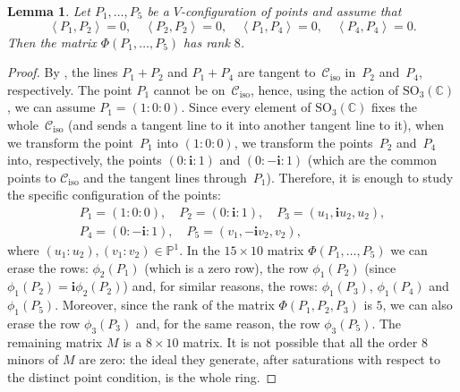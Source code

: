 \documentclass{amsart}
\theoremstyle{plain}
\newtheorem{lemma}{Lemma}[section]
\theoremstyle{definition}
\newcommand{\p}{\mathbb{P}}
\newcommand{\iso}{\mathcal{C}_{\mathrm{iso}}}
\newcommand{\scl}[2]{\left\langle {#1}, {#2} \right\rangle}
\newcommand{\iii}{\textbf{i}}
\begin{document}
\begin{lemma}
\label{lemma:special_case_rank_8}
Let $P_1, \dots, P_5$ be a $V$-configuration of points and assume that
\[
\scl{P_1}{P_2}=0, \quad \scl{P_2}{P_2}=0, \quad \scl{P_1}{P_4}=0,
\quad \scl{P_4}{P_4}=0.
\]
Then the matrix $\Phi(P_1, \dots, P_5)$ has rank $8$.
\end{lemma}
\begin{proof}
By ,
the lines $P_1+P_2$ and $P_1+P_4$ are tangent to~$\iso$ in~$P_2$ and~$P_4$, respectively. The point $P_1$ cannot be on~$\iso$, hence, using the
action of $\mathrm{SO}_3(\mathbb{C})$, we can assume $P_1 = (1: 0: 0)$.
Since every element of $\mathrm{SO}_3(\mathbb{C})$ fixes the whole~$\iso$ (and sends a tangent line to it into another tangent line to it), when we transform the point~$P_1$
into $(1: 0: 0)$, we transform the points~$P_2$ and~$P_4$ into, respectively,
the points $(0: \iii: 1)$ and $(0: -\iii: 1)$ (which are the common points to
$\iso$ and the tangent lines through~$P_1$).
Therefore, it is enough to study the
specific configuration of the points:
%
\begin{gather*}
P_1 = (1: 0: 0), \quad P_2=(0: \iii: 1), \quad P_3=(u_1, \iii u_2, u_2), \\
P_4 = (0: -\iii: 1), \quad P_5 = (v_1, -\iii v_2, v_2),
\end{gather*}
%
where $(u_1: u_2), (v_1: v_2) \in \p^1$.
In the $15\times 10$ matrix $\Phi(P_1, \dots, P_5)$ we can erase the
rows: $\phi_2(P_1)$ (which is a zero row), the row $\phi_1(P_2)$
(since $\phi_1(P_2)=\iii\phi_2(P_2)$) and, for similar reasons, the
rows: $\phi_1(P_3)$, $\phi_1(P_4)$ and $\phi_1(P_5)$.
Moreover, since the rank of the matrix $\Phi(P_1, P_2, P_3)$ is $5$,
we can also erase the row $\phi_3(P_3)$ and, for the same reason, the
row $\phi_3(P_5)$. The remaining matrix $M$ is a $8\times 10$ matrix.
It is not possible that all the order $8$ minors
of $M$ are zero: the ideal they generate, after saturations with respect to the distinct point condition, is the whole ring.
\end{proof}
\end{document}
